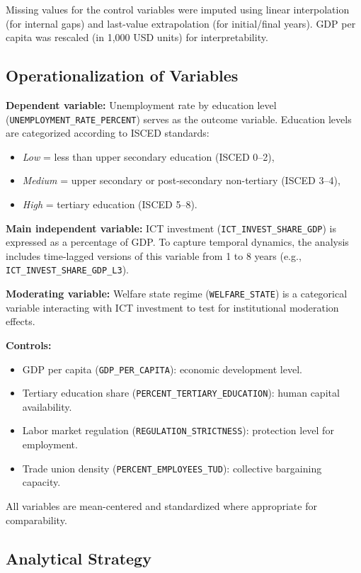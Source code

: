 Missing values for the control variables were imputed using linear interpolation (for internal gaps) 
and last-value extrapolation (for initial/final years). GDP per capita was rescaled (in 1,000 USD 
units) for interpretability.

\subsection{Operationalization of Variables}

\textbf{Dependent variable:}  
Unemployment rate by education level (\texttt{UNEMPLOYMENT\_RATE\_PERCENT}) serves as the outcome 
variable. Education levels are categorized according to ISCED standards:  
\begin{itemize}
  \item \textit{Low} = less than upper secondary education (ISCED 0–2),
  \item \textit{Medium} = upper secondary or post-secondary non-tertiary (ISCED 3–4),
  \item \textit{High} = tertiary education (ISCED 5–8).
\end{itemize}

\textbf{Main independent variable:}  
ICT investment (\texttt{ICT\_INVEST\_SHARE\_GDP}) is expressed as a percentage of GDP. To capture 
temporal dynamics, the analysis includes time-lagged versions of this variable from 1 to 8 years 
(e.g., \texttt{ICT\_INVEST\_SHARE\_GDP\_L3}).

\textbf{Moderating variable:}  
Welfare state regime (\texttt{WELFARE\_STATE}) is a categorical variable interacting with ICT 
investment to test for institutional moderation effects.

\textbf{Controls:}
\begin{itemize}
  \item GDP per capita (\texttt{GDP\_PER\_CAPITA}): economic development level.
  \item Tertiary education share (\texttt{PERCENT\_TERTIARY\_EDUCATION}): human capital availability.
  \item Labor market regulation (\texttt{REGULATION\_STRICTNESS}): protection level for employment.
  \item Trade union density (\texttt{PERCENT\_EMPLOYEES\_TUD}): collective bargaining capacity.
\end{itemize}

All variables are mean-centered and standardized where appropriate for comparability.

\subsection{Analytical Strategy}

